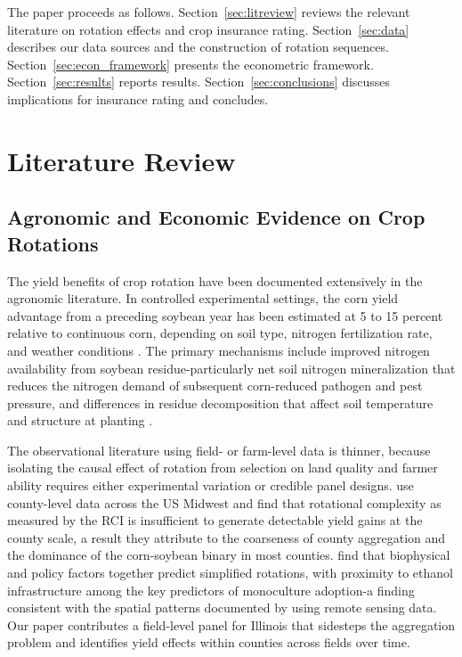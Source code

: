 \documentclass[12pt,letterpaper]{article}
\theoremstyle{remark}
\theoremstyle{remark}
\theoremstyle{plain}
\theoremstyle{definition}
\begin{document}
The paper proceeds as follows. Section~\ref{sec:litreview} reviews the relevant literature on rotation effects and crop insurance rating. Section~\ref{sec:data} describes our data sources and the construction of rotation sequences. Section~\ref{sec:econ_framework} presents the econometric framework. Section~\ref{sec:results} reports results. Section~\ref{sec:conclusions} discusses implications for insurance rating and concludes.

\section{\label{sec:litreview}Literature Review}
\subsection{\label{subsec:agronomy}Agronomic and Economic Evidence on Crop Rotations}

The yield benefits of crop rotation have been documented extensively in the agronomic literature. In controlled experimental settings, the corn yield advantage from a preceding soybean year has been estimated at 5 to 15 percent relative to continuous
corn, depending on soil type, nitrogen fertilization rate, and weather conditions \citep{Gentry2015, Farmaha2016}. The primary mechanisms include improved nitrogen availability from soybean residue-particularly net soil nitrogen mineralization that reduces the nitrogen demand of subsequent corn-reduced pathogen and pest pressure, and differences in residue decomposition that affect soil temperature and structure at planting \citep{Gentry2015}.
 
The observational literature using field- or farm-level data is thinner, because isolating the causal effect of rotation from selection on land quality and farmer ability requires either experimental variation or credible panel designs. \citet{burchfield2024} use county-level data across the US Midwest and find that rotational complexity as measured by the RCI is insufficient to generate detectable yield gains at the county scale, a result they attribute to the coarseness of county aggregation and the dominance of the corn-soybean binary in most counties. \citet{socolar2021} find that biophysical and policy factors together predict simplified rotations, with proximity to ethanol infrastructure among the key predictors of monoculture adoption-a finding consistent with the spatial patterns documented by \citet{pates2021} using remote sensing data. Our paper contributes a field-level panel for Illinois that sidesteps the aggregation problem and identifies yield effects within counties across fields over time.
 
\end{document}
